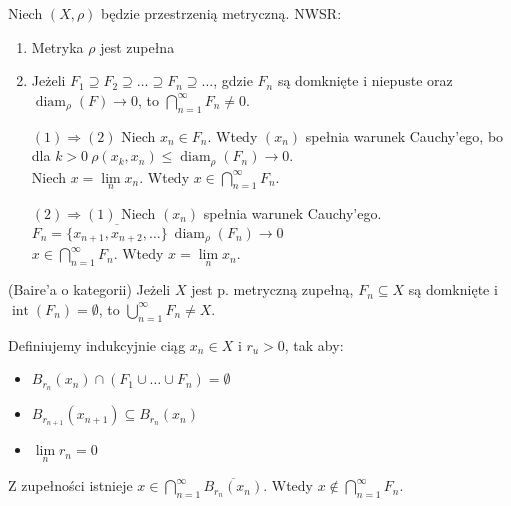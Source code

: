 \begin{tw} 
        Niech $(X,\rho)$ będzie przestrzenią metryczną. NWSR: 
        \begin{enumerate}[(1)]
            \item Metryka $\rho$ jest zupełna
            \item Jeżeli $F_1 \supseteq F_2 \supseteq \ldots \supseteq F_n \supseteq \ldots$, gdzie $F_n$ 
                są domknięte i niepuste oraz $\operatorname{diam}_\rho (F) \to 0$, to $\bigcap\limits_{n=1}^\infty F_n \neq 0$.
        \end{enumerate} 
\end{tw} 
\begin{dd} \hfill 
    \begin{itemize} 
        \item[$(1) \Rightarrow (2)$] Niech $x_n \in F_n$. Wtedy $(x_n)$ spełnia warunek Cauchy'ego, bo dla 
            $k > 0 \ \rho(x_k,x_n) \le \operatorname{diam}_\rho (F_n) \to 0$. \\ 
            Niech $x = \lim\limits_n x_n$. Wtedy $x \in \bigcap\limits_{n=1}^\infty F_n$.
        \item[$(2) \Rightarrow (1)$] Niech $(x_n)$ spełnia warunek Cauchy'ego. 
            $F_n = \overline{\{x_{n+1},x_{n+2},\ldots\}} \ \operatorname{diam}_\rho (F_n) \to 0$ \\
            $x \in \bigcap\limits_{n=1}^\infty F_n$. Wtedy $x = \lim\limits_n x_n$.
    \end{itemize} 
\end{dd} 
\begin{tw} (Baire'a o kategorii) Jeżeli $X$ jest p. metryczną zupełną, $F_n \subseteq X$ są domknięte i $\operatorname{int}(F_n) = \emptyset$,
to $\bigcup\limits_{n=1}^\infty F_n \neq X$. \end{tw} \begin{dd} Definiujemy indukcyjnie ciąg $x_n \in X$ i $r_u > 0$, tak aby: 
    \begin{itemize} 
        \item $B_{r_n}(x_n) \cap (F_1 \cup \ldots \cup F_n) = \emptyset$
        \item $B_{r_{n+1}}(x_{n+1}) \subseteq B_{r_n}(x_n) $
        \item $\lim\limits_n r_n = 0$
    \end{itemize} 
    Z zupełności istnieje $x \in \bigcap\limits_{n=1}^\infty \overline{B_{r_n}(x_n)}$. Wtedy 
    $x \notin \bigcap\limits_{n=1}^\infty F_n$. 
\end{dd} 
